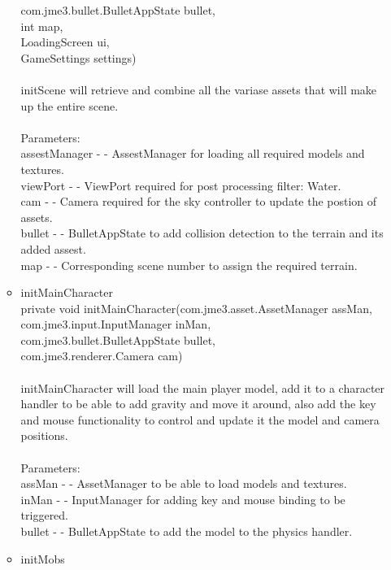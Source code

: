 \documentclass[letterpaper]{article}
\begin{document}
\begin{itemize}
\begin{itemize}
		             com.jme3.bullet.BulletAppState bullet, \\
		             int map, \\
		             LoadingScreen ui, \\
		             GameSettings settings) \\ \\
											initScene will retrieve and combine all the variase assets that will make up the entire scene. \\ \\
											Parameters: \\
											assestManager - - AssestManager for loading all required models and textures. \\
											viewPort - - ViewPort required for post processing filter: Water. \\
											cam - - Camera required for the sky controller to update the postion of assets. \\
											bullet - - BulletAppState to add collision detection to the terrain and its added assest. \\
											map - - Corresponding scene number to assign the required terrain.
									\item	initMainCharacter \\
											private void initMainCharacter(com.jme3.asset.AssetManager assMan, \\
		                     com.jme3.input.InputManager inMan, \\
		                     com.jme3.bullet.BulletAppState bullet, \\
		                     com.jme3.renderer.Camera cam) \\ \\
											initMainCharacter will load the main player model, add it to a character handler to be able to add gravity and move it around, also add the key and mouse functionality to control and update it the model and camera positions. \\ \\
											Parameters: \\
											assMan - - AssetManager to be able to load models and textures. \\
											inMan - - InputManager for adding key and mouse binding to be triggered. \\
											bullet - - BulletAppState to add the model to the physics handler.
									\item	initMobs \\

\end{itemize}
\end{itemize}
\end{document}

